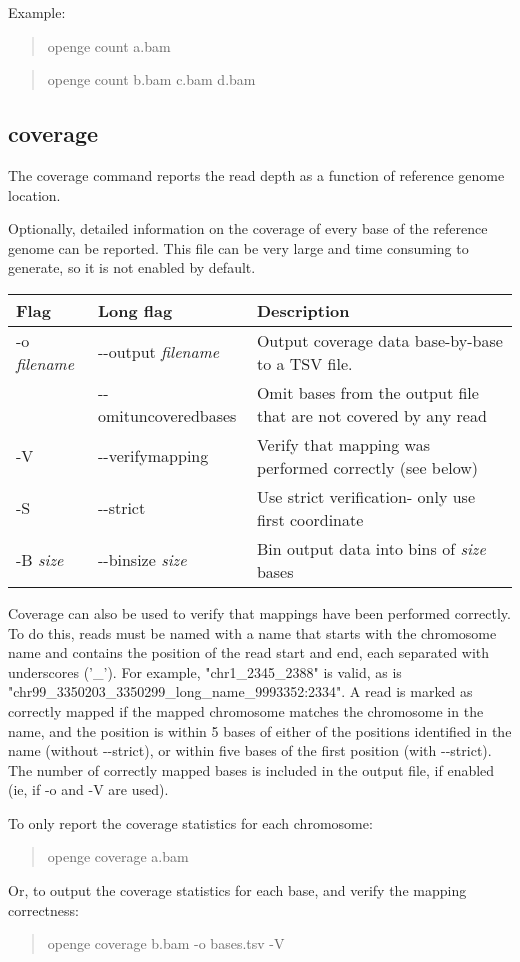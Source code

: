 \documentclass[11pt]{article}
\newcommand {\cmd}[1] {\begin{quote}#1\end{quote}}
\begin{document}
Example:
\cmd{openge count a.bam}
\cmd{openge count b.bam c.bam d.bam}

\subsection {coverage}
The coverage command reports the read depth as a function of reference genome location. 

Optionally, detailed information on the coverage of every base of the reference genome can be reported. This file can be very large and time consuming to generate, so it is not enabled by default. 

\begin{center}
\begin{tabular}{llp{3.5in}}
\hline
Flag&Long flag&Description\\ \hline
-o  \textit{filename}&{-}{-}output \textit{filename}&Output coverage data base-by-base to a TSV file.\\
&{-}{-}omituncoveredbases&Omit bases from the output file that are not covered by any read\\
-V&{-}{-}verifymapping&Verify that mapping was performed correctly (see below)\\
-S&{-}{-}strict&Use strict verification- only use first coordinate\\
-B \textit{size}&{-}{-}binsize \textit{size}&Bin output data into bins of \textit{size} bases\\
\end{tabular}
\end{center}

Coverage can also be used to verify that mappings have been performed correctly. To do this, reads must be named with a name that starts with the chromosome name and contains the position of the read start and end, each separated with underscores ('\_'). For example, "chr1\_2345\_2388" is valid, as is "chr99\_3350203\_3350299\_long\_name\_9993352:2334". A read is marked as correctly mapped if the mapped chromosome matches the chromosome in the name, and the position is within 5 bases of either of the positions identified in the name (without {-}{-}strict), or within five bases of the first position (with {-}{-}strict). The number of correctly mapped bases is included in the output file, if enabled (ie, if -o and -V are used).

To only report the coverage statistics for each chromosome:
\cmd{openge coverage a.bam}

Or, to output the coverage statistics for each base, and verify the mapping correctness:
\cmd{openge coverage b.bam -o bases.tsv -V}
\end{document}
